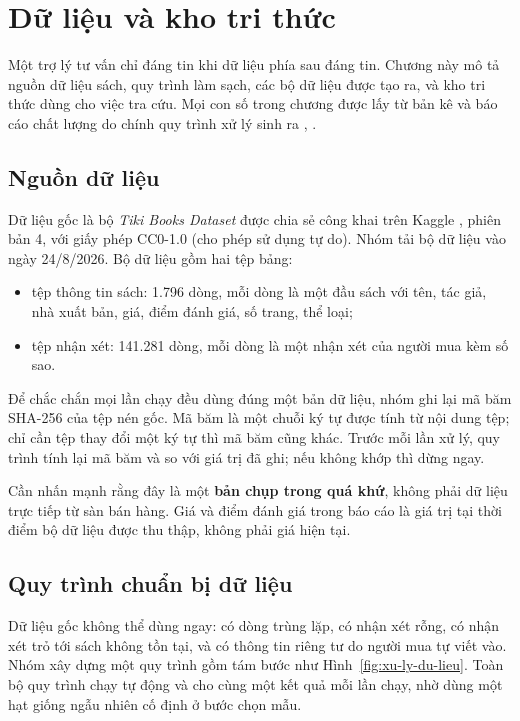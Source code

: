 \chapter{Dữ liệu và kho tri thức}
\label{ch:du-lieu}

Một trợ lý tư vấn chỉ đáng tin khi dữ liệu phía sau đáng tin. Chương này mô tả nguồn dữ liệu sách, quy trình làm sạch, các bộ dữ liệu được tạo ra, và kho tri thức dùng cho việc tra cứu. Mọi con số trong chương được lấy từ bản kê và báo cáo chất lượng do chính quy trình xử lý sinh ra , .

\section{Nguồn dữ liệu}

Dữ liệu gốc là bộ \emph{Tiki Books Dataset} được chia sẻ công khai trên Kaggle , phiên bản 4, với giấy phép CC0-1.0 (cho phép sử dụng tự do). Nhóm tải bộ dữ liệu vào ngày 24/8/2026. Bộ dữ liệu gồm hai tệp bảng:

\begin{itemize}
    \item tệp thông tin sách: 1.796 dòng, mỗi dòng là một đầu sách với tên, tác giả, nhà xuất bản, giá, điểm đánh giá, số trang, thể loại;
    \item tệp nhận xét: 141.281 dòng, mỗi dòng là một nhận xét của người mua kèm số sao.
\end{itemize}

Để chắc chắn mọi lần chạy đều dùng đúng một bản dữ liệu, nhóm ghi lại mã băm SHA-256 của tệp nén gốc. Mã băm là một chuỗi ký tự được tính từ nội dung tệp; chỉ cần tệp thay đổi một ký tự thì mã băm cũng khác. Trước mỗi lần xử lý, quy trình tính lại mã băm và so với giá trị đã ghi; nếu không khớp thì dừng ngay.

Cần nhấn mạnh rằng đây là một \textbf{bản chụp trong quá khứ}, không phải dữ liệu trực tiếp từ sàn bán hàng. Giá và điểm đánh giá trong báo cáo là giá trị tại thời điểm bộ dữ liệu được thu thập, không phải giá hiện tại.

\section{Quy trình chuẩn bị dữ liệu}

Dữ liệu gốc không thể dùng ngay: có dòng trùng lặp, có nhận xét rỗng, có nhận xét trỏ tới sách không tồn tại, và có thông tin riêng tư do người mua tự viết vào. Nhóm xây dựng một quy trình gồm tám bước như Hình~\ref{fig:xu-ly-du-lieu}. Toàn bộ quy trình chạy tự động và cho cùng một kết quả mỗi lần chạy, nhờ dùng một hạt giống ngẫu nhiên cố định ở bước chọn mẫu.

